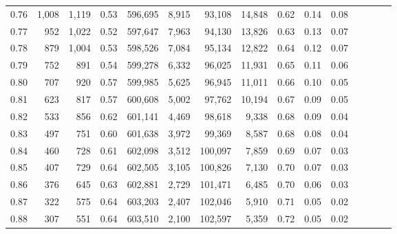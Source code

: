 \begin{tabular}{rrrcrrrrrrrrrrr}
0.76 &   1,008 &  1,119 &                                       0.53 &  596,695 &    8,915 &   93,108 &   14,848 &  0.62 &  0.14 &                         0.08 \\
0.77 &     952 &  1,022 &                                       0.52 &  597,647 &    7,963 &   94,130 &   13,826 &  0.63 &  0.13 &                         0.07 \\
0.78 &     879 &  1,004 &                                       0.53 &  598,526 &    7,084 &   95,134 &   12,822 &  0.64 &  0.12 &                         0.07 \\
0.79 &     752 &    891 &                                       0.54 &  599,278 &    6,332 &   96,025 &   11,931 &  0.65 &  0.11 &                         0.06 \\
0.80 &     707 &    920 &                                       0.57 &  599,985 &    5,625 &   96,945 &   11,011 &  0.66 &  0.10 &                         0.05 \\
0.81 &     623 &    817 &                                       0.57 &  600,608 &    5,002 &   97,762 &   10,194 &  0.67 &  0.09 &                         0.05 \\
0.82 &     533 &    856 &                                       0.62 &  601,141 &    4,469 &   98,618 &    9,338 &  0.68 &  0.09 &                         0.04 \\
0.83 &     497 &    751 &                                       0.60 &  601,638 &    3,972 &   99,369 &    8,587 &  0.68 &  0.08 &                         0.04 \\
0.84 &     460 &    728 &                                       0.61 &  602,098 &    3,512 &  100,097 &    7,859 &  0.69 &  0.07 &                         0.03 \\
0.85 &     407 &    729 &                                       0.64 &  602,505 &    3,105 &  100,826 &    7,130 &  0.70 &  0.07 &                         0.03 \\
0.86 &     376 &    645 &                                       0.63 &  602,881 &    2,729 &  101,471 &    6,485 &  0.70 &  0.06 &                         0.03 \\
0.87 &     322 &    575 &                                       0.64 &  603,203 &    2,407 &  102,046 &    5,910 &  0.71 &  0.05 &                         0.02 \\
0.88 &     307 &    551 &                                       0.64 &  603,510 &    2,100 &  102,597 &    5,359 &  0.72 &  0.05 &                         0.02 \\

\end{tabular}
